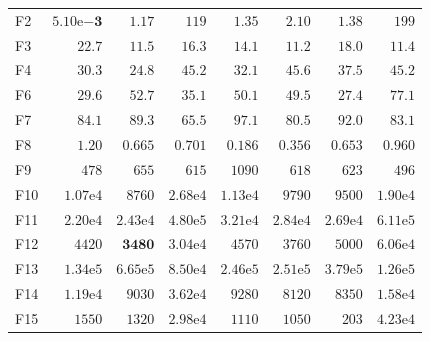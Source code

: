 \begin{tabular}{lrrrrrrr}
F2 & $\mathbf{5.10\mathrm{e}{-3}}$ & $1.17$ & $119$ & $1.35$ & $2.10$ & $1.38$ & $199$ \\
F3 & $22.7$ & $11.5$ & $16.3$ & $14.1$ & $11.2$ & $18.0$ & $11.4$ \\
F4 & $30.3$ & $24.8$ & $45.2$ & $32.1$ & $45.6$ & $37.5$ & $45.2$ \\
F6 & $29.6$ & $52.7$ & $35.1$ & $50.1$ & $49.5$ & $27.4$ & $77.1$ \\
F7 & $84.1$ & $89.3$ & $65.5$ & $97.1$ & $80.5$ & $92.0$ & $83.1$ \\
F8 & $1.20$ & $0.665$ & $0.701$ & $0.186$ & $0.356$ & $0.653$ & $0.960$ \\
F9 & $478$ & $655$ & $615$ & $1090$ & $618$ & $623$ & $496$ \\
F10 & $1.07\mathrm{e}{4}$ & $8760$ & $2.68\mathrm{e}{4}$ & $1.13\mathrm{e}{4}$ & $9790$ & $9500$ & $1.90\mathrm{e}{4}$ \\
F11 & $2.20\mathrm{e}{4}$ & $2.43\mathrm{e}{4}$ & $4.80\mathrm{e}{5}$ & $3.21\mathrm{e}{4}$ & $2.84\mathrm{e}{4}$ & $2.69\mathrm{e}{4}$ & $6.11\mathrm{e}{5}$ \\
F12 & $4420$ & $\mathbf{3480}$ & $3.04\mathrm{e}{4}$ & $4570$ & $3760$ & $5000$ & $6.06\mathrm{e}{4}$ \\
F13 & $1.34\mathrm{e}{5}$ & $6.65\mathrm{e}{5}$ & $8.50\mathrm{e}{4}$ & $2.46\mathrm{e}{5}$ & $2.51\mathrm{e}{5}$ & $3.79\mathrm{e}{5}$ & $1.26\mathrm{e}{5}$ \\
F14 & $1.19\mathrm{e}{4}$ & $9030$ & $3.62\mathrm{e}{4}$ & $9280$ & $8120$ & $8350$ & $1.58\mathrm{e}{4}$ \\
F15 & $1550$ & $1320$ & $2.98\mathrm{e}{4}$ & $1110$ & $1050$ & $203$ & $4.23\mathrm{e}{4}$ \\
\bottomrule
\end{tabular}
